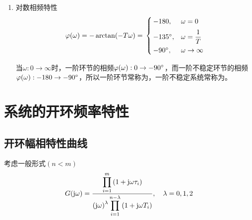 \begin{enumerate}[1.]
\begin{enumerate}[(1) ]
		\item 对数相频特性
		\vspace*{-0.5em}
		\begin{align}
			\varphi(\omega) = - \arctan(- T \omega) = \,
			\begin{cases}
				\, -180, & \omega = 0\\[0.5em]
				\, -135{}^{\circ} , & \omega = \dfrac{1}{T}\\[0.5em]
				\, -90 {}^{\circ}, & \omega \to \infty
			\end{cases}
		\end{align}
		\vspace*{-1em}
		
		当$\omega: 0 \to \infty$时，一阶环节的相频$\varphi(\omega ): 0 \to -90{}^{\circ}$，而一阶不稳定环节的相频$\varphi(\omega ): -180 \to -90{}^{\circ}$，所以一阶环节常称为，一阶不稳定系统常称为。
	\end{enumerate}
\end{enumerate}

\vspace*{-1em}
\warn[
{
\begin{enumerate}[1. ]
	\item 对最小相位系统，传递函数可由幅频特性曲线唯一确定；但非最小相位系统的传递函数则不能仅由幅频特性曲线决定。\vspace*{-0.5em}
	
	\item 对具有相同幅频特性的系统，最小相位系统的相角变化范围是最小的。\vspace*{-0.5em}
	
	\item 在计算角度时，设所有的环节都满足$0\degree \le \theta \le 180 \degree$，则 $\arctan(-T\omega) = 180 \degree - \arctan(T \omega)$，对于非最小相位环节需要做这个处理。
\end{enumerate}
}
]

\section{系统的开环频率特性}

\subsection{开环幅相特性曲线}

考虑一般形式$(n < m)$
\begin{align}
	G(\text{j} \omega) = \dfrac{\displaystyle \prod_{i=1}^{m} \left(1 + \text{j} \omega \tau_i \right)}{\displaystyle \left(\text{j} \omega\right)^{\lambda} \prod_{i=1}^{n - \lambda} \left(1 + \text{j} \omega T_i \right) }, \quad \lambda = 0,1,2
\end{align}

